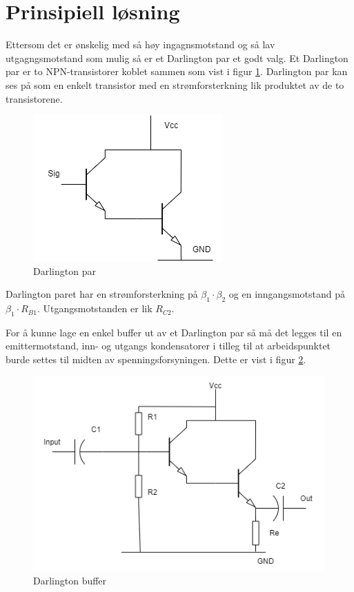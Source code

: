 \newpage
\section{Prinsipiell løsning}
\label{prinsipiellLoesning}

Ettersom det er ønskelig med så høy ingagnsmotstand og så lav utgagngsmotstand som mulig så er et Darlington par et godt valg. Et Darlington par er to NPN-transistorer koblet sammen som vist i figur \ref{fig:Darlington_basic}. Darlington par kan ses på som en enkelt transistor med en strømforsterkning lik produktet av de to transistorene.

\begin{figure}[H]
\centering
\includegraphics[scale=0.5]{bilder/Darlington_basic.drawio.png}
\caption{Darlington par}
\label{fig:Darlington_basic}
\end{figure}

Darlington paret har en strømforsterkning på $\beta_1 \cdot \beta_2$ og en inngangsmotstand på $\beta_1 \cdot R_{B1}$. Utgangsmotstanden er lik $R_{C2}$.

For å kunne lage en enkel buffer ut av et Darlington par så må det legges til en emittermotstand, inn- og utgangs kondensatorer i tilleg til at arbeidspunktet burde settes til midten av spenningsforsyningen. Dette er vist i figur \ref{fig:Darlington_buffer}.

\begin{figure}[H]
\centering
\includegraphics[scale=0.8]{bilder/Darlington_buffer.drawio.png}
\caption{Darlington buffer}
\label{fig:Darlington_buffer}
\end{figure}



